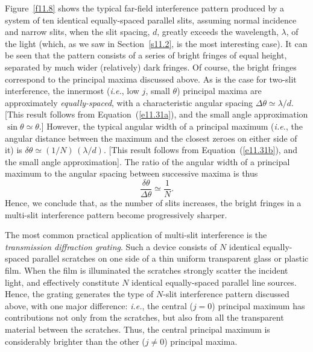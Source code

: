 Figure~\ref{f11.8} shows the typical  far-field interference pattern produced by a system of ten identical
equally-spaced parallel slits, assuming normal incidence and narrow slits, when the slit spacing, $d$, greatly exceeds the wavelength, $\lambda$,
of the light (which, as we saw in Section~\ref{s11.2}, is the most interesting case). It can be seen that the
pattern consists of a series of  bright fringes of equal height, separated by much wider
(relatively) dark fringes. Of course, the bright fringes correspond to the principal maxima discussed above. As is the case for two-slit interference, the innermost ({\em i.e.}, low $j$, small $\theta$) principal maxima are approximately {\em equally-spaced}, with a characteristic angular
spacing $\Delta\theta\simeq \lambda/d$. [This
result follows from Equation~(\ref{e11.31a}), and the small angle approximation $\sin\theta\simeq \theta$.]  However, the typical angular width of a principal maximum
({\em i.e.}, the angular distance between the maximum and the closest zeroes on either side of it) is $\delta\theta \simeq (1/N)\,(\lambda/d)$. [This result follows from Equation~(\ref{e11.31b}), and the small angle approximation]. The ratio of the angular width of a principal maximum to the angular spacing between successive maxima is thus
\begin{equation}
\frac{\delta\theta}{\Delta\theta}\simeq \frac{1}{N}.
\end{equation}
Hence, we conclude that, as the number of slits increases, the bright fringes in a multi-slit interference pattern become progressively sharper.  

The most common practical application of multi-slit interference is the {\em transmission diffraction grating}. Such a device consists
of $N$ identical equally-spaced  parallel scratches on one side of a thin  uniform  transparent glass or plastic film. When the film is illuminated  the scratches
strongly scatter the incident light, and effectively constitute  $N$ identical equally-spaced parallel line sources. Hence, the grating generates 
the type of $N$-slit interference pattern discussed above, with one major difference: {\em i.e.}, the central ($j=0$) principal maximum has
contributions not only from the scratches, but also from all the transparent material between the scratches. Thus, the central
principal maximum is considerably brighter than the other ($j\neq 0$) principal maxima. 

